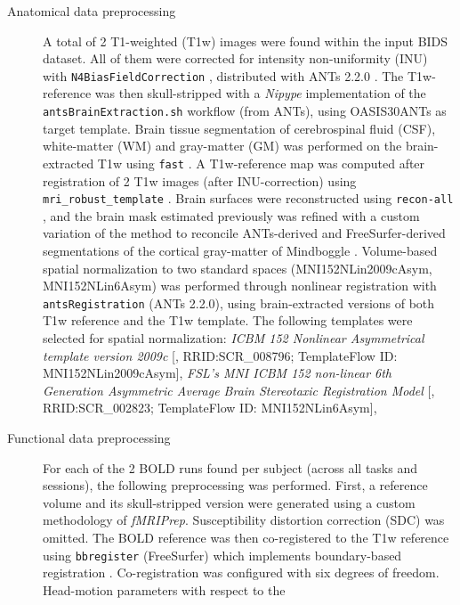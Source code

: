 \begin{description}
\item[Anatomical data preprocessing]
A total of 2 T1-weighted (T1w) images were found within the input BIDS
dataset. All of them were corrected for intensity non-uniformity (INU)
with \texttt{N4BiasFieldCorrection} \citep{n4}, distributed with ANTs
2.2.0 \citep[RRID:SCR\_004757]{ants}. The T1w-reference was then
skull-stripped with a \emph{Nipype} implementation of the
\texttt{antsBrainExtraction.sh} workflow (from ANTs), using OASIS30ANTs
as target template. Brain tissue segmentation of cerebrospinal fluid
(CSF), white-matter (WM) and gray-matter (GM) was performed on the
brain-extracted T1w using \texttt{fast} \citep[FSL 5.0.9,
RRID:SCR\_002823,][]{fsl_fast}. A T1w-reference map was computed after
registration of 2 T1w images (after INU-correction) using
\texttt{mri\_robust\_template} \citep[FreeSurfer 6.0.1,][]{fs_template}.
Brain surfaces were reconstructed using \texttt{recon-all}
\citep[FreeSurfer 6.0.1, RRID:SCR\_001847,][]{fs_reconall}, and the
brain mask estimated previously was refined with a custom variation of
the method to reconcile ANTs-derived and FreeSurfer-derived
segmentations of the cortical gray-matter of Mindboggle
\citep[RRID:SCR\_002438,][]{mindboggle}. Volume-based spatial
normalization to two standard spaces (MNI152NLin2009cAsym,
MNI152NLin6Asym) was performed through nonlinear registration with
\texttt{antsRegistration} (ANTs 2.2.0), using brain-extracted versions
of both T1w reference and the T1w template. The following templates were
selected for spatial normalization: \emph{ICBM 152 Nonlinear
Asymmetrical template version 2009c} {[}\citet{mni152nlin2009casym},
RRID:SCR\_008796; TemplateFlow ID: MNI152NLin2009cAsym{]}, \emph{FSL's
MNI ICBM 152 non-linear 6th Generation Asymmetric Average Brain
Stereotaxic Registration Model} {[}\citet{mni152nlin6asym},
RRID:SCR\_002823; TemplateFlow ID: MNI152NLin6Asym{]},
\item[Functional data preprocessing]
For each of the 2 BOLD runs found per subject (across all tasks and
sessions), the following preprocessing was performed. First, a reference
volume and its skull-stripped version were generated using a custom
methodology of \emph{fMRIPrep}. Susceptibility distortion correction
(SDC) was omitted. The BOLD reference was then co-registered to the T1w
reference using \texttt{bbregister} (FreeSurfer) which implements
boundary-based registration \citep{bbr}. Co-registration was configured
with six degrees of freedom. Head-motion parameters with respect to the

\end{description}
